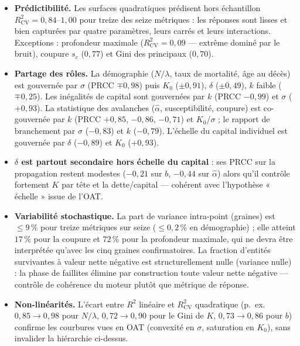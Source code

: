 \documentclass[11pt,a4paper]{article}
\begin{document}
\begin{itemize}
\item \textbf{Prédictibilité.} Les surfaces quadratiques prédisent hors
  échantillon $R^2_{\mathrm{CV}}=0{,}84$--$1{,}00$ pour treize des seize
  métriques : les réponses sont lisses et bien capturées par quatre
  paramètres, leurs carrés et leurs interactions. Exceptions :
  profondeur maximale ($R^2_{\mathrm{CV}}=0{,}09$ — extrême dominé par le
  bruit), coupure $s_c$ ($0{,}77$) et Gini des principaux ($0{,}70$).
\item \textbf{Partage des rôles.} La démographie ($N/\lambda$, taux de
  mortalité, âge au décès) est gouvernée par $\sigma$ (PRCC $\mp0{,}98$)
  puis $K_0$ ($\pm0{,}91$), $\delta$ ($\pm0{,}49$), $k$ faible
  ($\mp0{,}25$). Les inégalités de capital sont gouvernées par $k$
  (PRCC $-0{,}99$) et $\sigma$ ($+0{,}93$). La statistique des
  avalanches ($\hat\alpha$, susceptibilité, coupure) est co-gouvernée
  par $k$ (PRCC $+0{,}85$, $-0{,}86$, $-0{,}71$) et $K_0$/$\sigma$ ; le
  rapport de branchement par $\sigma$ ($-0{,}83$) et $k$ ($-0{,}79$).
  L'échelle du capital individuel est gouvernée par $\delta$
  ($-0{,}89$) et $K_0$ ($+0{,}93$).
\item \textbf{$\delta$ est partout secondaire hors échelle du capital} :
  ses PRCC sur la propagation restent modestes ($-0{,}21$ sur $b$,
  $-0{,}44$ sur $\hat\alpha$) alors qu'il contrôle fortement
  $K$ par tête et la dette/capital — cohérent avec l'hypothèse « échelle »
  issue de l'OAT.
\item \textbf{Variabilité stochastique.} La part de variance intra-point
  (graines) est $\le9\,\%$ pour treize métriques sur seize
  ($\le0{,}2\,\%$ en démographie) ; elle atteint $17\,\%$ pour la
  coupure et $72\,\%$ pour la profondeur maximale, qui ne devra être
  interprétée qu'avec les cinq graines confirmatoires. La fraction
  d'entités survivantes à valeur nette négative est structurellement
  nulle (variance nulle) : la phase de faillites élimine par
  construction toute valeur nette négative — contrôle de cohérence
  du moteur plutôt que métrique de réponse.
\item \textbf{Non-linéarités.} L'écart entre $R^2$ linéaire et
  $R^2_{\mathrm{CV}}$ quadratique (p.~ex. $0{,}85\to0{,}98$ pour
  $N/\lambda$, $0{,}72\to0{,}90$ pour le Gini de $K$, $0{,}73\to0{,}86$
  pour $b$) confirme les courbures vues en OAT (convexité en $\sigma$,
  saturation en $K_0$), sans invalider la hiérarchie ci-dessus.
\end{itemize}
\end{document}
